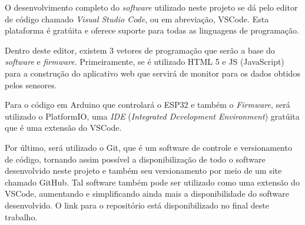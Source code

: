 O desenvolvimento completo do \textit{software} utilizado neste projeto se dá pelo editor de código chamado \textit{Visual Studio Code}, ou em abreviação, \gls{VSCode}. Esta plataforma é gratúita e oferece suporte para todas as linguagens de programação.

Dentro deste editor, existem 3 vetores de programação que serão a base do \textit{software} e \textit{firmware}. Primeiramente, se é utilizado \gls{HTML} 5 e \gls{JS} (JavaScript) para a construção do aplicativo web que servirá de monitor para os dados obtidos pelos sensores.

Para o código em Arduino que controlará o ESP32 e também o \textit{Firmware}, será utilizado o PlatformIO, uma \textit{\gls{IDE}} (\textit{Integrated Development Environment}) gratúita que é uma extensão do VSCode.

Por último, será utilizado o \gls{Git}, que é um software de controle e versionamento de código, tornando assim possível a disponibilização de todo o software desenvolvido neste projeto e também seu versionamento por meio de um site chamado \gls{GitHub}. Tal software também pode ser utilizado como uma extensão do VSCode, aumentando e simplificando ainda mais a disponibilidade do software desenvolvido. O link para o repositório está disponibilizado no final deste trabalho.



